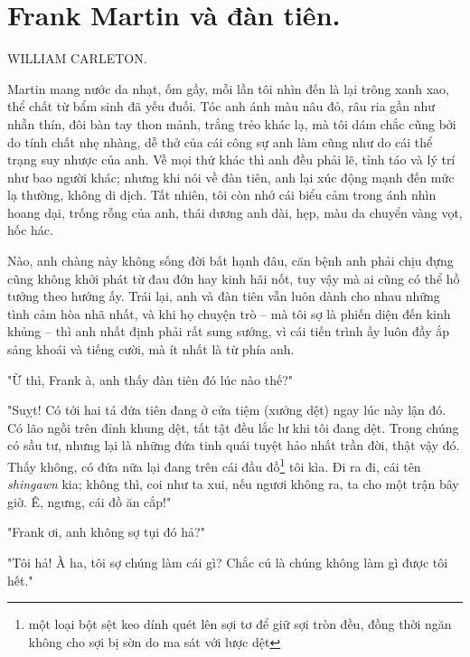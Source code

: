 \section{Frank Martin và đàn tiên.}

\begin{large}
  \begin{center}
    \uppercase{William Carleton.}
  \end{center}
\end{large}

Martin mang nước da nhạt, ốm gầy, mỗi lần tôi nhìn đến là lại trông xanh xao, thể chất từ bẩm sinh đã yếu đuối. Tóc anh ánh màu nâu đỏ, râu ria gần như nhẵn thín, đôi bàn tay thon mảnh, trắng trẻo khác lạ, mà tôi dám chắc cũng bởi do tính chất nhẹ nhàng, dễ thở của cái công sự anh làm cũng như do cái thể trạng suy nhược của anh. Về mọi thứ khác thì anh đều phải lẽ, tỉnh táo và lý trí như bao người khác; nhưng khi nói về đàn tiên, anh lại xúc động mạnh đến mức lạ thường, không di dịch. Tất nhiên, tôi còn nhớ cái biểu cảm trong ánh nhìn hoang dại, trống rỗng của anh, thái dương anh dài, hẹp, màu da chuyển vàng vọt, hốc hác.\par

Nào, anh chàng này không sống đời bất hạnh đâu, căn bệnh anh phải chịu đựng cũng không khởi phát từ đau đớn hay kinh hãi nốt, tuy vậy mà ai cũng có thể hồ tưởng theo hướng ấy. Trái lại, anh và đàn tiên vẫn luôn dành cho nhau những tình cảm hòa nhã nhất, và khi họ chuyện trò – mà tôi sợ là phiến diện đến kinh khủng – thì anh nhất định phải rất sung sướng, vì cái tiến trình ấy luôn đầy ắp sảng khoái và tiếng cười, mà ít nhất là từ phía anh.

"Ừ thì, Frank à, anh thấy đàn tiên đó lúc nào thế?"

"Suỵt! Có tới hai tá đứa tiên đang ở cửa tiệm (xưởng dệt) ngay lúc này lận đó. Có lão ngồi trên đỉnh khung dệt, tất tật đều lắc lư khi tôi đang dệt. Trong chúng có sầu tư, nhưng lại là những đứa tinh quái tuyệt hảo nhất trần đời, thật vậy đó. Thấy không, có đứa nữa lại đang trên cái đầu đồ\footnote{một loại bột sệt keo dính quét lên sợi tơ để giữ sợi tròn đều, đồng thời ngăn không cho sợi bị sờn do ma sát với lược dệt} tôi kìa. Đi ra đi, cái tên \textit{shingawn} kia; không thì, coi như ta xui, nếu ngươi không ra, ta cho một trận bây giờ. Ê, ngưng, cái đồ ăn cắp!"

"Frank ơi, anh không sợ tụi đó hả?"

"Tôi hả! À ha, tôi sợ chúng làm cái gì? Chắc cú là chúng không làm gì được tôi hết."

